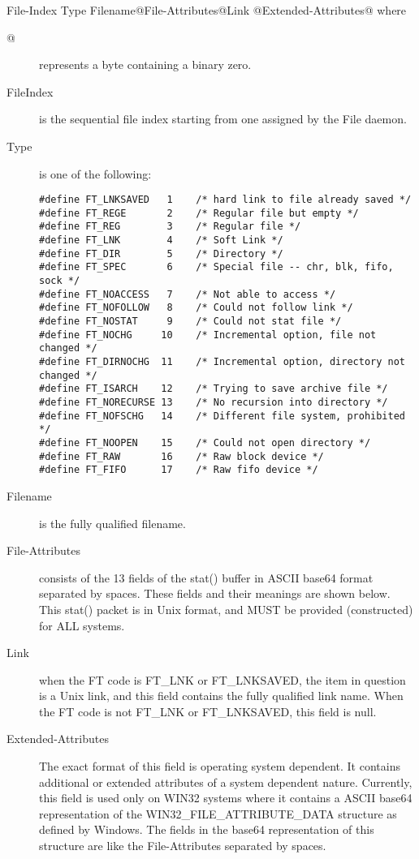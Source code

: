 \lt{}File-Index\gt{} \lt{}Type\gt{}
\lt{}Filename\gt{}@\lt{}File-Attributes\gt{}@\lt{}Link\gt{}
@\lt{}Extended-Attributes@\gt{} where 

\begin{description}

\item [@]
   represents a byte containing a binary zero.  

\item [FileIndex]
   is the sequential file index starting from one assigned  by the File daemon.  

\item [Type]
   is one of the following: 

\footnotesize
\begin{verbatim}
#define FT_LNKSAVED   1    /* hard link to file already saved */
#define FT_REGE       2    /* Regular file but empty */
#define FT_REG        3    /* Regular file */
#define FT_LNK        4    /* Soft Link */
#define FT_DIR        5    /* Directory */
#define FT_SPEC       6    /* Special file -- chr, blk, fifo, sock */
#define FT_NOACCESS   7    /* Not able to access */
#define FT_NOFOLLOW   8    /* Could not follow link */
#define FT_NOSTAT     9    /* Could not stat file */
#define FT_NOCHG     10    /* Incremental option, file not changed */
#define FT_DIRNOCHG  11    /* Incremental option, directory not changed */
#define FT_ISARCH    12    /* Trying to save archive file */
#define FT_NORECURSE 13    /* No recursion into directory */
#define FT_NOFSCHG   14    /* Different file system, prohibited */
#define FT_NOOPEN    15    /* Could not open directory */
#define FT_RAW       16    /* Raw block device */
#define FT_FIFO      17    /* Raw fifo device */
\end{verbatim}
\normalsize

\item [Filename]
   is the fully qualified filename.  

\item [File-Attributes]
   consists of the 13 fields of the stat() buffer in  ASCII base64 format
separated by spaces. These fields  and their meanings are shown below. This
stat() packet is in Unix  format, and MUST be provided (constructed) for ALL
systems.  

\item [Link]
   when the FT code is FT\_LNK or FT\_LNKSAVED, the item in  question is a Unix
link, and this field contains the fully  qualified link name. When the FT code
is not FT\_LNK or  FT\_LNKSAVED, this field is null.  

\item [Extended-Attributes]
   The exact format of this field is  operating system dependent. It contains
additional or extended  attributes of a system dependent nature. Currently,
this field is  used only on WIN32 systems where it contains a ASCII base64 
representation of the WIN32\_FILE\_ATTRIBUTE\_DATA structure as defined  by
Windows. The fields in the base64 representation of this structure  are like
the File-Attributes separated by spaces. 
\end{description}

